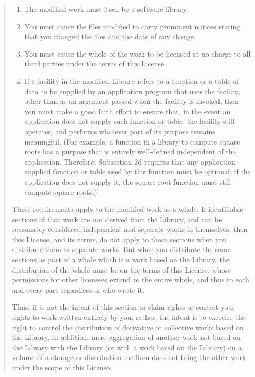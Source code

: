 \documentclass[
]{book}
\providecommand{\tightlist}{%
  \setlength{\itemsep}{0pt}\setlength{\parskip}{0pt}}
\theoremstyle{definition}
\theoremstyle{definition}
\theoremstyle{definition}
\theoremstyle{definition}
\theoremstyle{remark}
\begin{document}
\begin{quote}
\begin{enumerate}
\def\labelenumi{\alph{enumi})}
\tightlist
\item
  The modified work must itself be a software library.
\item
  You must cause the files modified to carry prominent notices
  stating that you changed the files and the date of any change.
\item
  You must cause the whole of the work to be licensed at no
  charge to all third parties under the terms of this License.
\item
  If a facility in the modified Library refers to a function or a
  table of data to be supplied by an application program that uses
  the facility, other than as an argument passed when the facility
  is invoked, then you must make a good faith effort to ensure that,
  in the event an application does not supply such function or
  table, the facility still operates, and performs whatever part of
  its purpose remains meaningful.
  (For example, a function in a library to compute square roots has
  a purpose that is entirely well-defined independent of the
  application. Therefore, Subsection 2d requires that any
  application-supplied function or table used by this function must
  be optional: if the application does not supply it, the square
  root function must still compute square roots.)
\end{enumerate}

These requirements apply to the modified work as a whole. If
identifiable sections of that work are not derived from the
Library, and can be reasonably considered independent and
separate works in themselves, then this License, and its terms,
do not apply to those sections when you distribute them as
separate works. But when you distribute the same sections as
part of a whole which is a work based on the Library, the
distribution of the whole must be on the terms of this License,
whose permissions for other licensees extend to the entire
whole, and thus to each and every part regardless of who wrote
it.

Thus, it is not the intent of this section to claim rights or
contest your rights to work written entirely by you; rather, the
intent is to exercise the right to control the distribution of
derivative or collective works based on the Library.
In addition, mere aggregation of another work not based on the
Library with the Library (or with a work based on the Library)
on a volume of a storage or distribution medium does not bring
the other work under the scope of this License.


\end{quote}
\end{document}
